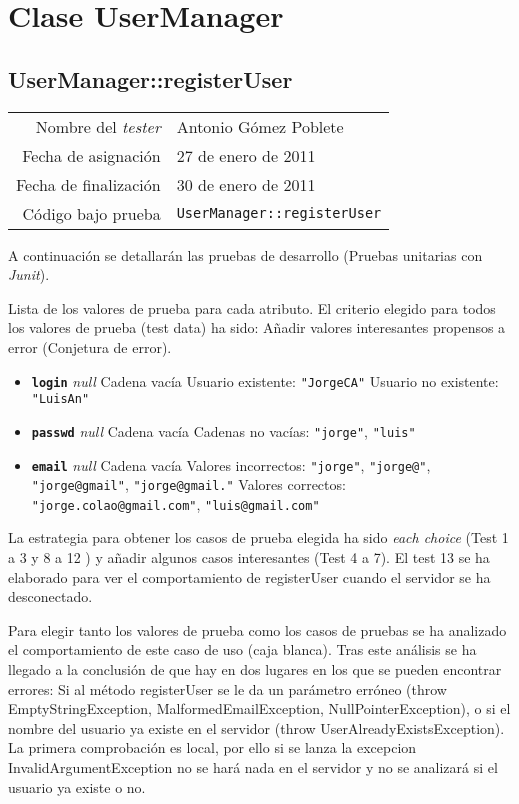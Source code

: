 \section{Clase UserManager}

\subsection{UserManager::registerUser}

{\small
\begin{tabular}{r|l}
Nombre del \textit{tester} & Antonio Gómez Poblete \\
Fecha de asignación & 27 de enero de 2011 \\
Fecha de finalización & 30 de enero de 2011 \\
Código bajo prueba & \texttt{UserManager::registerUser}
\end{tabular}
}

A continuación se detallarán las pruebas de desarrollo (Pruebas unitarias con \textit{Junit}).

Lista de los valores de prueba para cada atributo.
El criterio elegido para todos los valores de prueba (test data) ha sido: Añadir valores interesantes propensos a error (Conjetura de error).

\begin{itemize}
\item \textbf{\texttt{login}}
\subitem \textit{null}
\subitem Cadena vacía
\subitem Usuario existente: \texttt{"JorgeCA"}
\subitem Usuario no existente: \texttt{"LuisAn"}

\item \textbf{\texttt{passwd}}
\subitem \textit{null}
\subitem Cadena vacía
\subitem Cadenas no vacías: \texttt{"jorge"}, \texttt{"luis"}

\item \textbf{\texttt{email}}
\subitem \textit{null}
\subitem Cadena vacía
\subitem Valores incorrectos: \texttt{"jorge"}, \texttt{"jorge@"}, \texttt{"jorge@gmail"}, \texttt{"jorge@gmail."}
\subitem Valores correctos: \texttt{"jorge.colao@gmail.com"}, \texttt{"luis@gmail.com"}
\end{itemize}

La estrategia para obtener los casos de prueba elegida ha sido
\textit{each choice} (Test 1 a 3 y 8 a 12 ) y añadir algunos casos
interesantes (Test 4 a 7).
El test 13 se ha elaborado para ver el comportamiento de registerUser cuando el servidor se ha desconectado.

Para elegir tanto los valores de prueba como los casos de pruebas se ha analizado el comportamiento de este caso de uso (caja blanca). Tras este análisis se ha llegado a la conclusión de que hay en dos lugares en los que se pueden encontrar errores: Si al método registerUser se le da un parámetro erróneo (throw EmptyStringException, MalformedEmailException, NullPointerException), o si el nombre del usuario ya existe en el servidor (throw UserAlreadyExistsException). La primera comprobación es local, por ello si se lanza la excepcion InvalidArgumentException no se hará nada en el servidor y no se analizará si el usuario ya existe o no.

